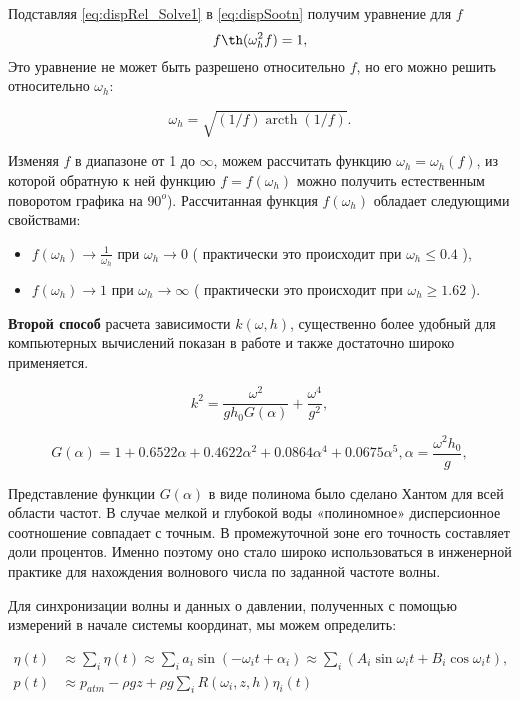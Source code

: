 Подставляя \eqref{eq:dispRel_Solve1} в \eqref{eq:dispSootn} получим уравнение для $f$
$$
f\th(\omega_h^2f)=1,
$$
Это уравнение не может быть разрешено относительно $f$, но его можно решить относительно $\omega_h$:

$$
\omega_h = \sqrt{(1/f)\operatorname{arcth}(1/f)}.
$$

Изменяя $f$ в диапазоне от 1 до $\infty$, можем рассчитать функцию $\omega_h=\omega_h(f)$, из которой обратную к ней функцию $f=f(\omega_h)$ можно получить естественным поворотом графика на $90^o$). Рассчитанная функция $f(\omega_h)$ обладает следующими свойствами:
\begin{itemize}
  \item $f(\omega_h)\rightarrow\frac{1}{\omega_h}$ при $\omega_h\rightarrow0$ ( практически это происходит при $\omega_h\leq0.4$ \cite{Zasl_Kras_2001}),
  \item $f(\omega_h)\rightarrow1$ при $\omega_h\rightarrow\infty$ ( практически это происходит при $\omega_h\geq1.62$ \cite{Zasl_Kras_2001}).
\end{itemize}

\textbf{Второй способ} расчета зависимости $k(\omega,h)$, существенно более удобный для компьютерных вычислений показан в работе \cite{hunt} и также достаточно широко применяется.

\begin{equation}\label{eq:hantApprox}
  k^2=\frac{\omega^2}{gh_0G(\alpha)}+\frac{\omega^4}{g^2},
\end{equation}

$$
G(\alpha)=1+0.6522\alpha+0.4622\alpha^2+0.0864\alpha^4+0.0675\alpha^5, \alpha=\frac{\omega^2h_0}{g},
$$

Представление функции $G(\alpha)$ в виде полинома было сделано Хантом \cite{hunt} для всей области частот. В случае мелкой и глубокой воды «полиномное» дисперсионное соотношение совпадает с точным. В промежуточной зоне его точность составляет доли процентов. Именно поэтому оно стало широко использоваться в инженерной практике для нахождения волнового числа по заданной частоте волны.

Для синхронизации волны и данных о давлении, полученных с помощью измерений в начале системы координат, мы можем определить:

\begin{align}\label{eq:longeHigg}
\eta(t)&\approx\sum\limits_i\eta(t)\approx\sum\limits_ia_i\sin(-\omega_it+\alpha_i)\approx
\sum\limits_i(A_i\sin\omega_it+B_i\cos\omega_it),&\\
p(t)&\approx p_{atm}-\rho gz+\rho g\sum\limits_iR(\omega_i,z,h)\eta_i(t)
\end{align}


